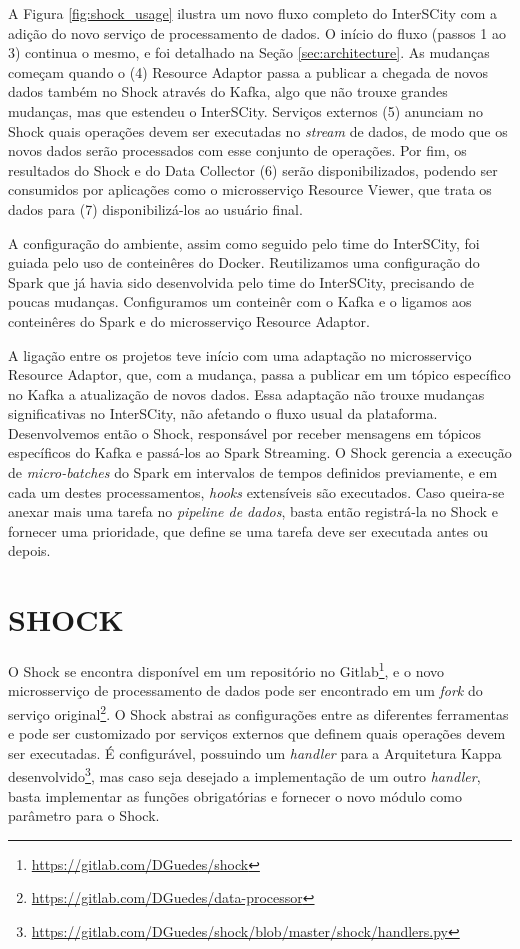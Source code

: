 A Figura \ref{fig:shock_usage} ilustra um novo fluxo completo do InterSCity
com a adição do novo serviço de processamento de dados. O início do fluxo
(passos 1 ao 3) continua o mesmo, e foi detalhado na Seção
\ref{sec:architecture}. As mudanças começam quando o (4) Resource Adaptor passa
a publicar a chegada de novos dados também no Shock através do Kafka, algo que
não trouxe grandes mudanças, mas que estendeu o InterSCity. Serviços externos
(5) anunciam no Shock quais operações devem ser executadas no \textit{stream}
de dados, de modo que os novos dados serão processados com esse conjunto de
operações. Por fim, os resultados do Shock e do Data Collector (6) serão
disponibilizados, podendo ser consumidos por aplicações como o microsserviço
Resource Viewer, que trata os dados para (7) disponibilizá-los ao usuário final.

A configuração do ambiente, assim como seguido pelo time do InterSCity, foi
guiada pelo uso de conteinêres do Docker. Reutilizamos uma configuração do
Spark que já havia sido desenvolvida pelo time do InterSCity, precisando de
poucas mudanças. Configuramos um conteinêr com o Kafka e o ligamos
aos conteinêres do Spark e do microsserviço Resource Adaptor.

A ligação entre os projetos teve início com uma adaptação no microsserviço
Resource Adaptor, que, com a mudança, passa a publicar em um tópico específico
no Kafka a atualização de novos dados. Essa adaptação não trouxe mudanças
significativas no InterSCity, não afetando o fluxo usual da plataforma.
Desenvolvemos então o Shock, responsável por receber mensagens em tópicos
específicos do Kafka e passá-los ao Spark Streaming. O Shock gerencia a
execução de \textit{micro-batches} do Spark em intervalos de tempos definidos
previamente, e em cada um destes processamentos, \textit{hooks} extensíveis são
executados. Caso queira-se anexar mais uma tarefa no
\textit{pipeline de dados}, basta então registrá-la no Shock e fornecer uma
prioridade, que define se uma tarefa deve ser executada antes ou depois.

\section{SHOCK}

O Shock se encontra disponível em um repositório no
Gitlab\footnote{\url{https://gitlab.com/DGuedes/shock}}, e o novo microsserviço
de processamento de dados pode ser encontrado em um \textit{fork} do serviço
original\footnote{\url{https://gitlab.com/DGuedes/data-processor}}. O Shock
abstrai as configurações entre as diferentes ferramentas e pode ser customizado
por serviços externos que definem quais operações devem ser executadas.
É configurável, possuindo um \textit{handler} para a Arquitetura Kappa
desenvolvido\footnote{\url{https://gitlab.com/DGuedes/shock/blob/master/shock/handlers.py}},
mas caso seja desejado a implementação de um outro \textit{handler}, basta
implementar as funções obrigatórias e fornecer o novo módulo como parâmetro
para o Shock.

